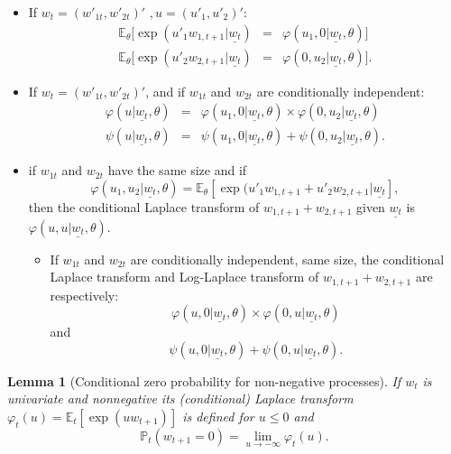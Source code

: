 \documentclass[
  12pt,
]{book}
\providecommand{\tightlist}{%
  \setlength{\itemsep}{0pt}\setlength{\parskip}{0pt}}
\newtheorem{lemma}{Lemma}[chapter]
\theoremstyle{definition}
\theoremstyle{definition}
\theoremstyle{definition}
\theoremstyle{definition}
\theoremstyle{remark}
\begin{document}
\begin{itemize}
\item
  If \(w_t=(w'_{1t},w'_{2t})'\) \(, u=(u'_1, u'_2)'\):
  \begin{eqnarray*}
  \mathbb{E}_{\theta}[\exp(u'_1 w_{1,t+1}|\underline{w_t})&=&\varphi(u_1,0|\underline{w_t},\theta)] \\
  \mathbb{E}_{\theta}[\exp(u'_2 w
  _{2,t+1}|\underline{w_t})&=&\varphi(0,u_2|\underline{w_t},\theta)].
  \end{eqnarray*}
\item
  If \(w_t=(w'_{1t},w'_{2t})'\), and if \(w_{1t}\) and \(w_{2t}\) are conditionally independent:
  \begin{eqnarray*}
  \varphi(u|\underline{w_t},\theta) &=&
  \varphi(u_1,0|\underline{w_t},\theta)\times\varphi(0,u_2|\underline{w_t},\theta) \\
  \psi(u|\underline{w_t},\theta) &=&
  \psi(u_1,0|\underline{w_t},\theta)+\psi(0,u_2|\underline{w_t},\theta).
  \end{eqnarray*}
\item
  if \(w_{1t}\) and \(w_{2t}\) have the same size and if
  \[
  \varphi(u_1, u_2|\underline{w_t},\theta) = \mathbb{E}_\theta[\exp(u'_1 w_{1, t+1} + u'_2 w_{2,t+1}|\underline{w_t}],
  \]
  then the conditional Laplace transform of \(w_{1, t+1} + w_{2, t+1}\) given
  \(\underline{w_t}\) is \(\varphi(u, u|\underline{w_t},\theta)\).

  \begin{itemize}
  \tightlist
  \item
    If \(w_{1t}\) and \(w_{2t}\) are conditionally independent,
    same size, the conditional Laplace transform and Log-Laplace
    transform of \(w_{1,t+1}+w_{2,t+1}\) are respectively:
    \[
    \varphi(u,0|\underline{w_t},\theta)\times \varphi(0,
    u|\underline{w_t},\theta)
    \]
    and
    \[
    \psi(u,0|\underline{w_t},\theta)+ \psi(0,
    u|\underline{w_t},\theta).
    \]
  \end{itemize}
\end{itemize}

\begin{lemma}[Conditional zero probability for non-negative processes]
\protect\hypertarget{lem:lemMass}{}\label{lem:lemMass}If \(w_t\) is univariate and nonnegative its (conditional)
Laplace transform \(\varphi_t(u) = \mathbb{E}_t[\exp(u w_{t+1})]\) is defined
for \(u \leq 0\) and
\[
\mathbb{P}_t(w_{t+1} = 0) = \lim_{u\rightarrow - \infty} \varphi_t(u).
\]
\end{lemma}
\end{document}
